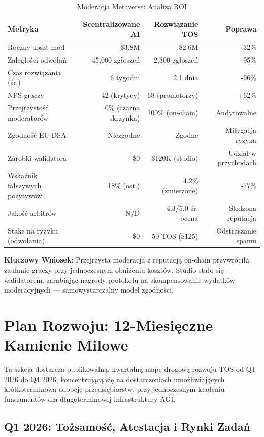 \documentclass[11pt]{article}
\begin{document}
\begin{table}[H]
\centering
\caption{Moderacja Metaverse: Analiza ROI}
\label{tab:metaverse-roi}
\begin{tabular}{@{}lrrr@{}}
\toprule
\textbf{Metryka} & \textbf{Scentralizowane AI} & \textbf{Rozwiązanie TOS} & \textbf{Poprawa} \\ \midrule
Roczny koszt mod & \$3.8M & \$2.6M & -32\% \\
Zaległości odwołań & 45,000 zgłoszeń & 2,300 zgłoszeń & -95\% \\
Czas rozwiązania (śr.) & 6 tygodni & 2.1 dnia & -96\% \\
NPS graczy & 42 (krytycy) & 68 (promotorzy) & +62\% \\
Przejrzystość moderatorów & 0\% (czarna skrzynka) & 100\% (on-chain) & Audytowalne \\
Zgodność EU DSA & Niezgodne & Zgodne & Mitygacja ryzyka \\
Zarobki walidatora & \$0 & \$120K (studio) & Udział w przychodach \\
Wskaźnik fałszywych pozytywów & 18\% (ost.) & 4.2\% (zmierzone) & -77\% \\
Jakość arbitrów & N/D & 4.3/5.0 śr. ocena & Śledzona reputacja \\
Stake na ryzyku (odwołania) & \$0 & 50 TOS (\$125) & Odstraszanie spamu \\
\bottomrule
\end{tabular}
\end{table}

\textbf{Kluczowy Wniosek}: Przejrzysta moderacja z reputacją on-chain przywróciła zaufanie graczy przy jednoczesnym obniżeniu kosztów. Studio stało się walidatorem, zarabiając nagrody protokołu na skompensowanie wydatków moderacyjnych — samowystarczalny model zgodności.

\section{Plan Rozwoju: 12-Miesięczne Kamienie Milowe}
\label{sec:12month-roadmap}

Ta sekcja dostarcza publikowalną, kwartalną mapę drogową rozwoju TOS od Q1 2026 do Q4 2026, koncentrującą się na dostarczeniach umożliwiających krótkoterminową adopcję przedsiębiorstw, przy jednoczesnym kładeniu fundamentów dla długoterminowej infrastruktury AGI.

\subsection{Q1 2026: Tożsamość, Atestacja i Rynki Zadań}
\end{document}
